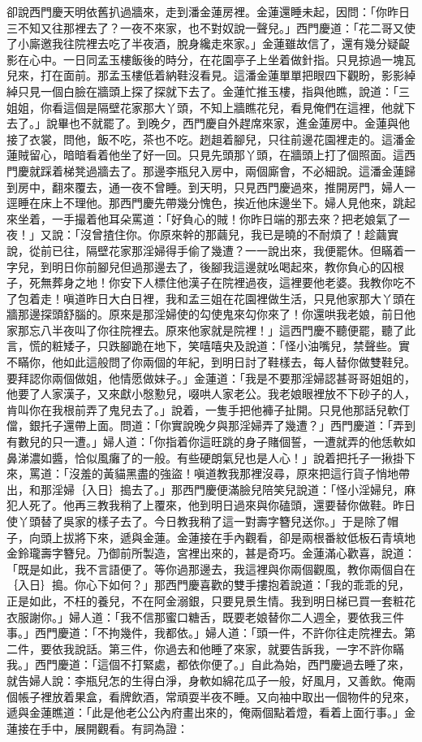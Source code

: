 \begin{showcontents}{}
卻說西門慶天明依舊扒過牆來，走到潘金蓮房裡。金蓮還睡未起，因問：「你昨日三不知又往那裡去了？一夜不來家，也不對奴說一聲兒。」西門慶道：「花二哥又使了小廝邀我往院裡去吃了半夜酒，脫身纔走來家。」金蓮雖故信了，還有幾分疑齪影在心中。一日同孟玉樓飯後的時分，在花園亭子上坐着做針指。只見掠過一塊瓦兒來，打在面前。那孟玉樓低着納鞋沒看見。這潘金蓮單單把眼四下觀盼，影影綽綽只見一個白臉在牆頭上探了探就下去了。金蓮忙推玉樓，指與他瞧，說道：「三姐姐，你看這個是隔壁花家那大丫頭，不知上牆瞧花兒，看見俺們在這裡，他就下去了。」說畢也不就罷了。到晚夕，西門慶自外趕席來家，進金蓮房中。金蓮與他接了衣裳，問他，飯不吃，茶也不吃。趔趄着腳兒，只往前邊花園裡走的。這潘金蓮賊留心，暗暗看着他坐了好一回。只見先頭那丫頭，在牆頭上打了個照面。這西門慶就踩着梯凳過牆去了。那邊李瓶兒入房中，兩個廝會，不必細說。這潘金蓮歸到房中，翻來覆去，通一夜不曾睡。到天明，只見西門慶過來，推開房門，婦人一逕睡在床上不理他。那西門慶先帶幾分愧色，挨近他床邊坐下。婦人見他來，跳起來坐着，一手撮着他耳朵罵道：「好負心的賊！你昨日端的那去來？把老娘氣了一夜！」又說：「沒曾揸住你。你原來幹的那繭兒，我已是曉的不耐煩了！趁繭實說，從前已往，隔壁花家那淫婦得手偷了幾遭？一一說出來，我便罷休。但瞞着一字兒，到明日你前腳兒但過那邊去了，後腳我這邊就吆喝起來，教你負心的囚根子，死無葬身之地！你安下人標住他漢子在院裡過夜，這裡要他老婆。我教你吃不了包着走！嗔道昨日大白日裡，我和孟三姐在花園裡做生活，只見他家那大丫頭在牆那邊探頭舒腦的。原來是那淫婦使的勾使鬼來勾你來了！你還哄我老娘，前日他家那忘八半夜叫了你往院裡去。原來他家就是院裡！」這西門慶不聽便罷，聽了此言，慌的粧矮子，只跌腳跪在地下，笑嘻嘻央及說道：「怪小油嘴兒，禁聲些。實不瞞你，他如此這般問了你兩個的年紀，到明日討了鞋樣去，每人替你做雙鞋兒。要拜認你兩個做姐，他情愿做妹子。」金蓮道：「我是不要那淫婦認甚哥哥姐姐的，他要了人家漢子，又來獻小慇懃兒，啜哄人家老公。我老娘眼裡放不下砂子的人，肯叫你在我根前弄了鬼兒去了。」說着，一隻手把他褲子扯開。只見他那話兒軟仃儅，銀托子還帶上面。問道：「你實說晚夕與那淫婦弄了幾遭？」西門慶道：「弄到有數兒的只一遭。」婦人道：「你指着你這旺跳的身子賭個誓，一遭就弄的他恁軟如鼻涕濃如醬，恰似風癱了的一般。有些硬朗氣兒也是人心！」說着把托子一揪掛下來，罵道：「沒羞的黃貓黑盡的強盜！嗔道教我那裡沒尋，原來把這行貨子悄地帶出，和那淫婦｛入日｝搗去了。」那西門慶便滿臉兒陪笑兒說道：「怪小淫婦兒，麻犯人死了。他再三教我稍了上覆來，他到明日過來與你磕頭，還要替你做鞋。昨日使丫頭替了吳家的樣子去了。今日教我稍了這一對壽字簪兒送你。」于是除了帽子，向頭上拔將下來，遞與金蓮。金蓮接在手內觀看，卻是兩根番紋低板石青填地金鈴瓏壽字簪兒。乃御前所製造，宮裡出來的，甚是奇巧。金蓮滿心歡喜，說道：「既是如此，我不言語便了。等你過那邊去，我這裡與你兩個觀風，教你兩個自在｛入日｝搗。你心下如何？」那西門慶喜歡的雙手摟抱着說道：「我的乖乖的兒，正是如此，不枉的養兒，不在阿金溺銀，只要見景生情。我到明日梯已買一套粧花衣服謝你。」婦人道：「我不信那蜜口糖舌，既要老娘替你二人週全，要依我三件事。」西門慶道：「不拘幾件，我都依。」婦人道：「頭一件，不許你往走院裡去。第二件，要依我說話。第三件，你過去和他睡了來家，就要告訴我，一字不許你瞞我。」西門慶道：「這個不打緊處，都依你便了。」自此為始，西門慶過去睡了來，就告婦人說：李瓶兒怎的生得白淨，身軟如綿花瓜子一般，好風月，又善飲。俺兩個帳子裡放着果盒，看牌飲酒，常頑耍半夜不睡。又向袖中取出一個物件的兒來，遞與金蓮瞧道：「此是他老公公內府畫出來的，俺兩個點着燈，看着上面行事。」金蓮接在手中，展開觀看。有詞為證：


\end{showcontents}
